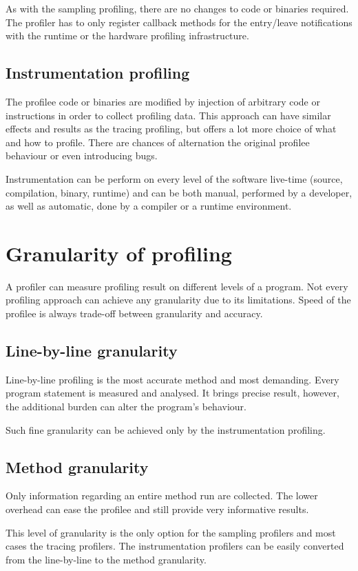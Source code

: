As with the sampling profiling, there are no changes to code or binaries required. The profiler has to only register callback methods for the entry/leave notifications with the runtime or the hardware profiling infrastructure.

\subsection{Instrumentation profiling}
The profilee code or binaries are modified by injection of arbitrary code or instructions in order to collect profiling data. This approach can have similar effects and results as the tracing profiling, but offers a lot more choice of what and how to profile. There are chances of alternation the original profilee behaviour or even introducing bugs.

Instrumentation can be perform on every level of the software live-time (source, compilation, binary, runtime) and can be both manual, performed by a developer, as well as automatic, done by a compiler or a runtime environment.

\section{Granularity of profiling}
A profiler can measure profiling result on different levels of a program. Not every profiling approach can achieve any granularity due to its limitations. Speed of the profilee is always trade-off between granularity and accuracy. 

\subsection{Line-by-line granularity}
Line-by-line profiling is the most accurate method and most demanding. Every program statement is measured and analysed. It brings precise result, however, the additional burden can alter the program's behaviour.

Such fine granularity can be achieved only by the instrumentation profiling.

\subsection{Method granularity} 
Only information regarding an entire method run are collected. The lower overhead can ease the profilee and still provide very informative results.

This level of granularity is the only option for the sampling profilers and most cases the tracing profilers. The instrumentation profilers can be easily converted from the line-by-line to the method granularity.

